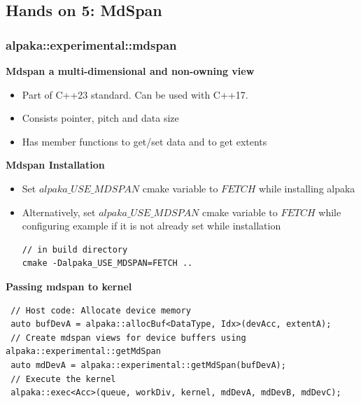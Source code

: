 \documentclass[9pt]{beamer}
\begin{document}
\subsection{Hands on 5: MdSpan}
\begin{frame}[fragile]
\small
\frametitle{alpaka::experimental::mdspan}
\textbf{Mdspan a multi-dimensional and non-owning view}
\begin{itemize}
\item Part of C++23 standard. Can be used with C++17.
\item Consists pointer, pitch and data size
\item Has member functions to get/set data and to get extents
 \end{itemize}
 \textbf{Mdspan Installation}
 \begin{itemize}
\item Set $alpaka\_USE\_MDSPAN$ cmake variable to $FETCH$ while installing alpaka
\item Alternatively, set $alpaka\_USE\_MDSPAN$ cmake variable to $FETCH$ while configuring example if it is not already set while installation
\begin{lstlisting}
// in build directory
cmake -Dalpaka_USE_MDSPAN=FETCH ..
 \end{lstlisting}
\end{itemize}
\textbf{Passing mdspan to kernel}
\lstset{basicstyle=\ttfamily\scriptsize}
\begin{lstlisting}
 // Host code: Allocate device memory
 auto bufDevA = alpaka::allocBuf<DataType, Idx>(devAcc, extentA);
 // Create mdspan views for device buffers using alpaka::experimental::getMdSpan
 auto mdDevA = alpaka::experimental::getMdSpan(bufDevA);
 // Execute the kernel
 alpaka::exec<Acc>(queue, workDiv, kernel, mdDevA, mdDevB, mdDevC);
 \end{lstlisting}
 \end{frame}
\end{document}
